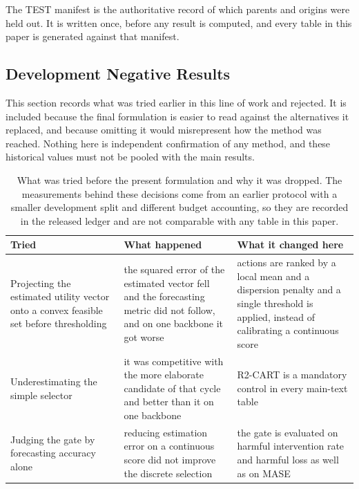 \documentclass{article}
\begin{document}
The TEST manifest is the authoritative record of which parents and origins were held out. It
is written once, before any result is computed, and every table in this paper is generated
against that manifest.

\subsection{Development Negative Results}
\label{app:development}
This section records what was tried earlier in this line of work and rejected. It is included
because the final formulation is easier to read against the alternatives it replaced, and
because omitting it would misrepresent how the method was reached. Nothing here is independent
confirmation of any method, and these historical values must not be pooled with the main results.

\begin{table}[htbp]
  \caption{What was tried before the present formulation and why it was dropped. The
  measurements behind these decisions come from an earlier protocol with a smaller development
  split and different budget accounting, so they are recorded in the released ledger and are
  not comparable with any table in this paper.}
  \label{tab:app-development}
  \centering
  \small
  \setlength{\tabcolsep}{4pt}
\begin{tabular}{@{}p{} p{} p{}@{}}
    \toprule
    Tried & What happened & What it changed here \\
    \midrule
    Projecting the estimated utility vector onto a convex feasible set before thresholding & the squared error of the estimated vector fell and the forecasting metric did not follow, and on one backbone it got worse & actions are ranked by a local mean and a dispersion penalty and a single threshold is applied, instead of calibrating a continuous score \\
    Underestimating the simple selector & it was competitive with the more elaborate candidate of that cycle and better than it on one backbone & R2-CART is a mandatory control in every main-text table \\
    Judging the gate by forecasting accuracy alone & reducing estimation error on a continuous score did not improve the discrete selection & the gate is evaluated on harmful intervention rate and harmful loss as well as on MASE \\
    \bottomrule
  \end{tabular}
\end{table}
\end{document}
